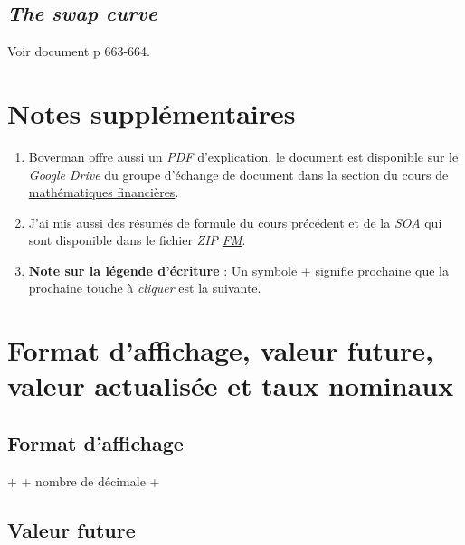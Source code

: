 \documentclass[11pt,french]{report}
\begin{document}
\section{\emph{The swap curve}}
Voir document p 663-664.




\appendix

\chapter{Notes supplémentaires}

\begin{enumerate}
\item Boverman offre aussi un \emph{PDF} d'explication, le document est disponible sur le \emph{Google Drive} du groupe d'échange de document dans la section du cours de \href{https://drive.google.com/open?id=0B6kXivc6X9LITmdBVFVWSDAxeE0}{mathématiques financières}.
\item J'ai mis aussi des résumés de formule du cours précédent et de la \emph{SOA} qui sont disponible dans le fichier \emph{ZIP}  \href{https://drive.google.com/open?id=0B6kXivc6X9LIYUFKaHcxNmtiUUk}{\emph{FM}}.
\item \textbf{Note sur la légende d'écriture} : 
Un symbole + signifie prochaine que la prochaine touche à \textit{cliquer} est la suivante.

\end{enumerate}

\chapter{Format d'affichage, valeur future, valeur actualisée et taux nominaux}
\label{chap:annexe affichage, futur, actualisation}


\section{Format d'affichage}
\label{sec:affichage}

 +  + nombre de décimale + 

\section{Valeur future}
\label{sec:accumulation}
\end{document}
